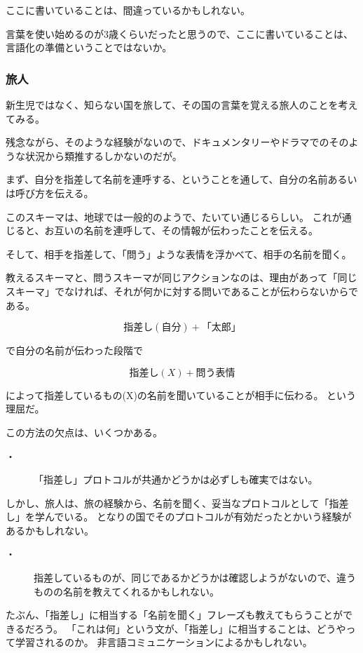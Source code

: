 \documentclass[10pt, oneside]{jarticle}   	%
\begin{document}
ここに書いていることは、間違っているかもしれない。

言葉を使い始めるのが3歳くらいだったと思うので、ここに書いていることは、言語化の準備ということではないか。

\subsubsection{旅人}
新生児ではなく、知らない国を旅して、その国の言葉を覚える旅人のことを考えてみる。

残念ながら、そのような経験がないので、ドキュメンタリーやドラマでのそのような状況から類推するしかないのだが。

まず、自分を指差して名前を連呼する、ということを通して、自分の名前あるいは呼び方を伝える。

このスキーマは、地球では一般的のようで、たいてい通じるらしい。
これが通じると、お互いの名前を連呼して、その情報が伝わったことを伝える。

そして、相手を指差して、「問う」ような表情を浮かべて、相手の名前を聞く。

教えるスキーマと、問うスキーマが同じアクションなのは、理由があって「同じスキーマ」でなければ、それが何かに対する問いであることが伝わらないからである。

$$指差し(自分) + 「太郎」$$

で自分の名前が伝わった段階で

$$指差し(X) + 問う表情$$

によって指差しているもの(X)の名前を聞いていることが相手に伝わる。
という理屈だ。

この方法の欠点は、いくつかある。
\begin{description}
\item[・]「指差し」プロトコルが共通かどうかは必ずしも確実ではない。
\end{description}
しかし、旅人は、旅の経験から、名前を聞く、妥当なプロトコルとして「指差し」を学んでいる。
となりの国でそのプロトコルが有効だったとかいう経験があるかもしれない。
\begin{description}
\item[・] 指差しているものが、同じであるかどうかは確認しようがないので、違うものの名前を教えてくれるかもしれない。
\end{description}

たぶん、「指差し」に相当する「名前を聞く」フレーズも教えてもらうことができるだろう。
「これは何」という文が、「指差し」に相当することは、どうやって学習されるのか。
非言語コミュニケーションによるかもしれない。
\end{document}
